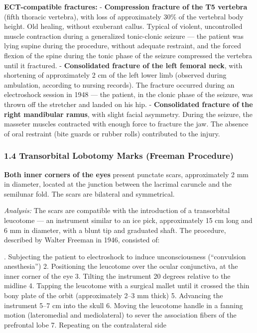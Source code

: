 \noindent \textbf{ECT-compatible fractures:}
- \textbf{Compression fracture of the T5 vertebra} (fifth thoracic vertebra), with loss of approximately 30\% of the vertebral body height. Old healing, without exuberant callus. Typical of violent, uncontrolled muscle contraction during a generalized tonic-clonic seizure --- the patient was lying supine during the procedure, without adequate restraint, and the forced flexion of the spine during the tonic phase of the seizure compressed the vertebra until it fractured.
- \textbf{Consolidated fracture of the left femoral neck}, with shortening of approximately 2 cm of the left lower limb (observed during ambulation, according to nursing records). The fracture occurred during an electroshock session in 1948 --- the patient, in the clonic phase of the seizure, was thrown off the stretcher and landed on his hip.
- \textbf{Consolidated fracture of the right mandibular ramus}, with slight facial asymmetry. During the seizure, the masseter muscles contracted with enough force to fracture the jaw. The absence of oral restraint (bite guards or rubber rolls) contributed to the injury.

\subsubsection*{1.4 Transorbital Lobotomy Marks (Freeman Procedure)}

\noindent \textbf{Both inner corners of the eyes} present punctate scars, approximately 2 mm in diameter, located at the junction between the lacrimal caruncle and the semilunar fold. The scars are bilateral and symmetrical.

\noindent \textit{Analysis:} The scars are compatible with the introduction of a transorbital leucotome --- an instrument similar to an ice pick, approximately 15 cm long and 6 mm in diameter, with a blunt tip and graduated shaft. The procedure, described by Walter Freeman in 1946, consisted of:

. Subjecting the patient to electroshock to induce unconsciousness (``convulsion anesthesia'')
2. Positioning the leucotome over the ocular conjunctiva, at the inner corner of the eye
3. Tilting the instrument 20 degrees relative to the midline
4. Tapping the leucotome with a surgical mallet until it crossed the thin bony plate of the orbit (approximately 2--3 mm thick)
5. Advancing the instrument 5--7 cm into the skull
6. Moving the leucotome handle in a fanning motion (lateromedial and mediolateral) to sever the association fibers of the prefrontal lobe
7. Repeating on the contralateral side

